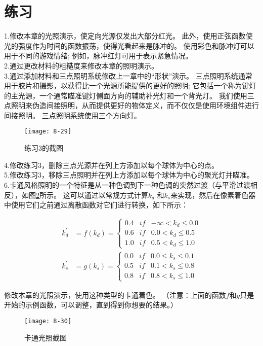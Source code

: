 \section{练习}
\begin{flushleft}
1.修改本章的光照演示，使定向光源仅发出大部分红光。 此外，使用正弦函数使光的强度作为时间的函数振荡，使得光看起来是脉冲的。 使用彩色和脉冲灯可以用于不同的游戏情绪; 例如，脉冲红灯可用于表示紧急情况。\\

2.通过更改材料的粗糙度来修改本章的照明演示。\\
3.通过添加材料和三点照明系统修改上一章中的“形状”演示。 三点照明系统通常用于胶片和摄影，以获得比一个光源所能提供的更好的照明; 它包括一个称为键灯的主光源，一个通常瞄准键灯侧面方向的辅助补光灯和一个背光灯。 我们使用三点照明来伪造间接照明，从而提供更好的物体定义，而不仅仅是使用环境组件进行间接照明。 三点照明系统使用三个方向灯。\\
\end{flushleft}

\begin{figure}[h]
    \label{fig:8-29}
    \texttt{[image: 8-29]}
    \centering
    \caption{练习3的截图}
\end{figure}

\begin{flushleft}
4.修改练习3，删除三点光源并在列上方添加以每个球体为中心的点。\\
5.修改练习3，移除三点照明并在列上方添加以每个球体为中心的聚光灯并瞄准。\\
6.卡通风格照明的一个特征是从一种色调到下一种色调的突然过渡（与平滑过渡相反），如图\ref{fig:8-30}所示。 这可以通过以常规方式计算$k_{d}$ 和$k_{s}$来实现，然后在像素着色器中使用它们之前通过离散函数对它们进行转换，如下所示：\\
\end{flushleft}

\begin{align*}
k^{'}_{d}&=f(k_{d})=\left\{\begin{matrix}
0.4 & if & -\infty < k_{d} \leq 0.0 \\ 
0.6 & if & 0.0 < k_{d} \leq 0.5 \\
1.0 & if & 0.5 < k_{d} \leq 1.0 
\end{matrix}\right. \\
k^{'}_{s}&=g(k_{s})=\left\{\begin{matrix}
0.0 & if & 0.0 \leq k_{s} \leq 0.1 \\ 
0.5 & if & 0.1 < k_{s} \leq 0.8 \\
0.8 & if & 0.8 < k_{s} \leq 1.0 
\end{matrix}\right.
\end{align*}

\begin{flushleft}
修改本章的光照演示，使用这种类型的卡通着色。 （注意：上面的函数$f$和$g$只是开始的示例函数，可以调整，直到得到你想要的结果。）
\end{flushleft}

\begin{figure}[h]
    \label{fig:8-30}
    \texttt{[image: 8-30]}
    \centering
    \caption{卡通光照截图}
\end{figure}


